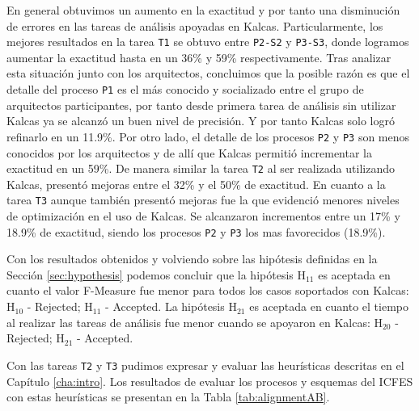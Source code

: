 En general obtuvimos un aumento en la exactitud y por tanto una disminuci\'on de errores en las tareas de an\'alisis apoyadas en Kalcas. Particularmente, los mejores resultados en la tarea \texttt{T1} se obtuvo entre \texttt{P2-S2} y \texttt{P3-S3}, donde logramos aumentar la exactitud hasta en un 36\% y 59\% respectivamente. Tras analizar esta situaci\'on junto con los arquitectos, concluimos que la posible raz\'on es que el detalle del proceso \texttt{P1} es el m\'as conocido y socializado entre el grupo de arquitectos participantes, por tanto desde primera tarea de an\'alisis sin utilizar Kalcas ya se alcanz\'o un buen nivel de precisi\'on. Y por tanto Kalcas solo logr\'o refinarlo en un 11.9\%. Por otro lado, el detalle de los procesos \texttt{P2} y \texttt{P3} son menos conocidos por los arquitectos y de all\'i que Kalcas permiti\'o incrementar la exactitud en un 59\%. De manera similar la tarea \texttt{T2} al ser realizada utilizando Kalcas, present\'o mejoras entre el 32\% y el 50\% de exactitud. En cuanto a la tarea \texttt{T3} aunque tambi\'en present\'o mejoras fue la que evidenci\'o menores niveles de optimizaci\'on en el uso de Kalcas. Se alcanzaron incrementos entre un 17\% y 18.9\% de exactitud, siendo los procesos \texttt{P2} y \texttt{P3} los mas favorecidos (18.9\%).

Con los resultados obtenidos y volviendo sobre las hip\'otesis definidas en la Secci\'on \ref{sec:hypothesis} podemos concluir que la hip\'otesis H$_{11}$ es aceptada en cuanto el valor F-Measure fue menor para todos los casos soportados con Kalcas: H$_{10}$ - Rejected; H$_{11}$ - Accepted. La hip\'otesis H$_{21}$ es aceptada en cuanto el tiempo al realizar las tareas de an\'alisis fue menor cuando se apoyaron en Kalcas: H$_{20}$ - Rejected; H$_{21}$ - Accepted.

Con las tareas \texttt{T2} y \texttt{T3} pudimos expresar y evaluar las heur\'isticas descritas en el Cap\'itulo \ref{cha:intro}. Los resultados de evaluar los procesos y esquemas del ICFES con estas heur\'isticas se presentan en la Tabla \ref{tab:alignmentAB}.

